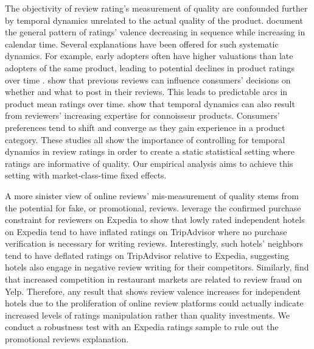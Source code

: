\documentclass[mksc,blindrev]{informs3} %
\begin{document}
The objectivity of review rating's measurement of quality are confounded further by temporal dynamics unrelated to the actual quality of the product. \citet{godes2012sequential} document the general pattern of ratings' valence decreasing in sequence while increasing in calendar time. Several explanations have been offered for such systematic dynamics. For example, early adopters often have higher valuations than late adopters of the same product, leading to potential declines in product ratings over time \citep{li2008self}. \citet{moe2012online} show that previous reviews can influence consumers' decisions on whether and what to post in their reviews. This leads to predictable arcs in product mean ratings over time. \citet{mcauley2013amateurs} show that temporal dynamics can also result from reviewers' increasing expertise for connoisseur products. Consumers' preferences tend to shift and converge as they gain experience in a product category. These studies all show the importance of controlling for temporal dynamics in review ratings in order to create a static statistical setting where ratings are informative of quality. Our empirical analysis aims to achieve this setting with market-class-time fixed effects. 

A more sinister view of online reviews' mis-measurement of quality stems from the potential for fake, or promotional, reviews. \citet{mayzlin2014promotional} leverage the confirmed purchase constraint for reviewers on Expedia to show that lowly rated independent hotels on Expedia tend to have inflated ratings on TripAdvisor where no purchase verification is necessary for writing reviews. Interestingly, such hotels' neighbors tend to have deflated ratings on TripAdvisor relative to Expedia, suggesting hotels also engage in negative review writing for their competitors. Similarly, \citet{luca2016fake} find that increased competition in restaurant markets are related to review fraud on Yelp. Therefore, any result that shows review valence increases for independent hotels due to the proliferation of online review platforms could actually indicate increased levels of ratings manipulation rather than quality investments. We conduct a robustness test with an Expedia ratings sample to rule out the promotional reviews explanation.
\end{document}
